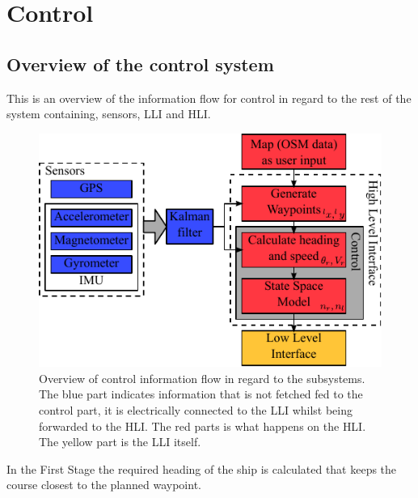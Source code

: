 \chapter{Control}
\label{chap:control}

\section{Overview of the control system}
This is an overview of the information flow for control in regard to the rest of the system containing, sensors, \ac{LLI} and \ac{HLI}.

\begin{figure}[htbp]
	\centering
	\includegraphics[width=\textwidth]{img/vessel-block-overview}
	\caption{Overview of control information flow in regard to the subsystems. The blue part indicates information that is not fetched fed to the control part, it is electrically connected to the \ac{LLI} whilst being forwarded to the \ac{HLI}. The red parts is what happens on the \ac{HLI}. The yellow part is the \ac{LLI} itself.}
	\label{fig:vessel-block-overview}
\end{figure}




In the First Stage the required heading of the ship is calculated that keeps the course closest to the planned waypoint.

